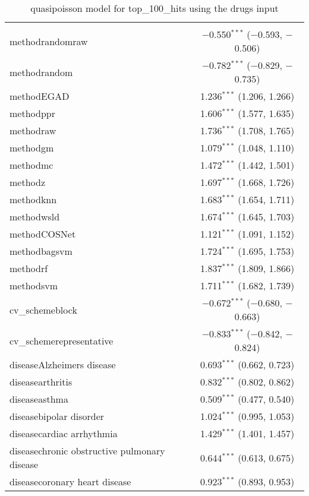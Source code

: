 
\begin{table}[!htbp] \centering 
  \caption{quasipoisson model for top_100_hits using the drugs input} 
  \label{} 
\begin{tabular}{@{\extracolsep{5pt}}lc} 
\\[-1.8ex]\hline 
\hline \\[-1.8ex] 
 methodrandomraw & $-$0.550$^{***}$ ($-$0.593, $-$0.506) \\ 
  methodrandom & $-$0.782$^{***}$ ($-$0.829, $-$0.735) \\ 
  methodEGAD & 1.236$^{***}$ (1.206, 1.266) \\ 
  methodppr & 1.606$^{***}$ (1.577, 1.635) \\ 
  methodraw & 1.736$^{***}$ (1.708, 1.765) \\ 
  methodgm & 1.079$^{***}$ (1.048, 1.110) \\ 
  methodmc & 1.472$^{***}$ (1.442, 1.501) \\ 
  methodz & 1.697$^{***}$ (1.668, 1.726) \\ 
  methodknn & 1.683$^{***}$ (1.654, 1.711) \\ 
  methodwsld & 1.674$^{***}$ (1.645, 1.703) \\ 
  methodCOSNet & 1.121$^{***}$ (1.091, 1.152) \\ 
  methodbagsvm & 1.724$^{***}$ (1.695, 1.753) \\ 
  methodrf & 1.837$^{***}$ (1.809, 1.866) \\ 
  methodsvm & 1.711$^{***}$ (1.682, 1.739) \\ 
  cv\_schemeblock & $-$0.672$^{***}$ ($-$0.680, $-$0.663) \\ 
  cv\_schemerepresentative & $-$0.833$^{***}$ ($-$0.842, $-$0.824) \\ 
  diseaseAlzheimers disease & 0.693$^{***}$ (0.662, 0.723) \\ 
  diseasearthritis & 0.832$^{***}$ (0.802, 0.862) \\ 
  diseaseasthma & 0.509$^{***}$ (0.477, 0.540) \\ 
  diseasebipolar disorder & 1.024$^{***}$ (0.995, 1.053) \\ 
  diseasecardiac arrhythmia & 1.429$^{***}$ (1.401, 1.457) \\ 
  diseasechronic obstructive pulmonary disease & 0.644$^{***}$ (0.613, 0.675) \\ 
  diseasecoronary heart disease & 0.923$^{***}$ (0.893, 0.953) \\ 

\end{tabular}
\end{table}
